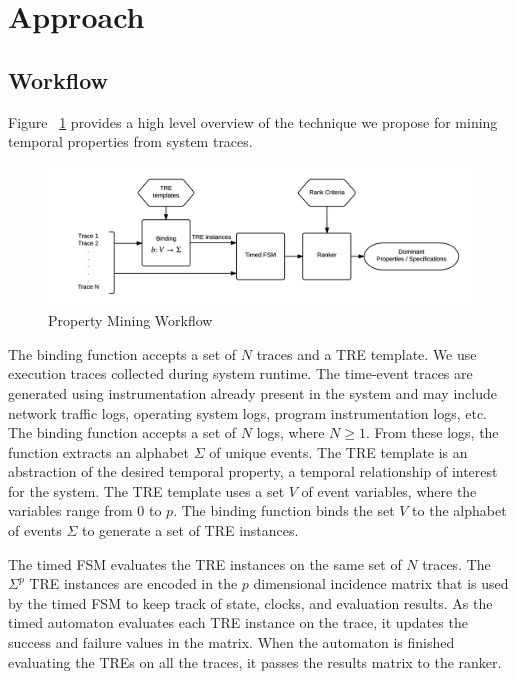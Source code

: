 \documentclass[]{sigplanconf}
\begin{document}
\section{Approach} \label{Approach}

\subsection{Workflow}

Figure ~\ref{fig:approach} provides a high level overview of the technique we propose for mining temporal properties from system traces.

\begin{figure}[h]
  \centering
  \includegraphics[trim = 1cm 0cm 0cm 0cm,clip = true,width=\linewidth]{figures/Workflow.png}
  \caption{Property Mining Workflow}
  \label{fig:approach}
\end{figure}

The binding function accepts a set of $N$ traces and a TRE template. We use execution traces collected during system runtime. The time-event traces are generated using instrumentation already present in the system and may include network traffic logs, operating system logs, program instrumentation logs, etc. The binding function accepts a set of $N$ logs, where $N \ge 1$. From these logs, the function extracts an alphabet $\Sigma$ of unique events. The TRE template is an abstraction of the desired temporal property, a temporal relationship of interest for the system. The TRE template uses a set $V$ of event variables, where the variables range from $0$ to $p$. The binding function binds the set $V$ to the alphabet of events $\Sigma$ to generate a set of TRE instances.


The timed FSM evaluates the TRE instances on the same set of $N$ traces. The $\Sigma^p$ TRE instances are encoded in the $p$ dimensional incidence matrix that is used by the timed FSM to keep track of state, clocks, and evaluation results. As the timed automaton evaluates each TRE instance on the trace, it updates the success and failure values in the matrix. When the automaton is finished evaluating the TREs on all the traces, it passes the results matrix to the ranker.
\end{document}
